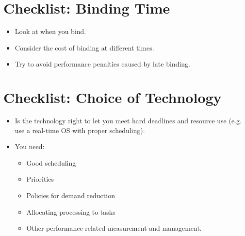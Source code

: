 \documentclass{report}
\begin{document}
\section{Checklist: Binding Time}
\begin{itemize}
\item{Look at when you bind.}
\item{Consider the cost of binding at different times.}
\item{Try to avoid performance penalties caused by late binding.}
\end{itemize}

\section{Checklist: Choice of Technology}
\begin{itemize}
\item{Is the technology right to let you meet hard deadlines and resource use (e.g. use a real-time OS with proper scheduling).}
\item{You need:
\begin{itemize}
\item{Good scheduling}
\item{Priorities}
\item{Policies for demand reduction}
\item{Allocating processing to tasks}
\item{Other performance-related measurement and management.}
\end{itemize}}
\end{itemize}
\end{document}
